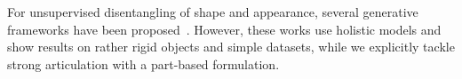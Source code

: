	For unsupervised disentangling of shape and appearance, several generative frameworks have been proposed~\cite{shu18shapeappear, xing18shapeappear}.
	However, these works use holistic models and show results on rather rigid objects and simple datasets, while we explicitly tackle strong articulation with a part-based formulation.


